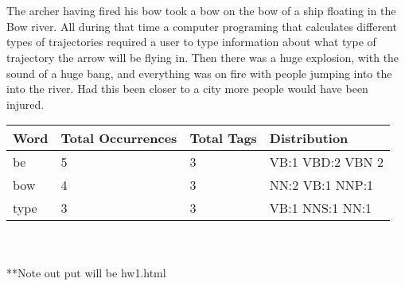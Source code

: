 \documentclass[12pt]{article}
\begin{document}
\section{}
The archer having fired his bow took a bow on the bow of a ship floating in the Bow river.
 All during that time a computer programing that calculates 
 different types of trajectories required a user to type
  information about what type of trajectory the arrow will
   be flying in. Then there was a huge explosion, with the
 sound of a huge bang, and everything was on fire with people jumping into the into the river.  Had this been closer to a city more people would have been injured.
\\



\begin{tabular}{ | l | l | l | l | }
	\hline
	Word & Total Occurrences & Total Tags & Distribution\\\hline
	be & 5 & 3 & VB:1 VBD:2 VBN 2 \\\hline
	bow & 4 & 3 & NN:2 VB:1 NNP:1\\\hline
	type & 3 & 3 & VB:1  NNS:1 NN:1\\\hline
	\end{tabular}
\\
\\
**Note out put will be hw1.html
\cite{Cat_Tag_Words}


\end{document}

